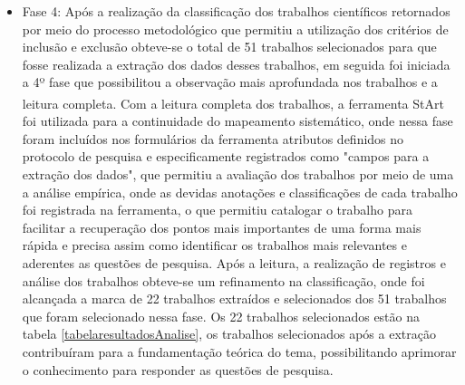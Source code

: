 \begin{itemize}
\item Fase 4: Após a realização da classificação dos trabalhos científicos retornados por meio do processo metodológico que permitiu a utilização dos critérios de inclusão e exclusão obteve-se o total de 51 trabalhos selecionados para que fosse realizada a extração dos dados desses trabalhos, em seguida foi iniciada a 4º fase que possibilitou a observação mais aprofundada nos trabalhos e a leitura completa. Com a leitura completa dos trabalhos, a ferramenta \acrshort{StArt}\textsuperscript{\textregistered} foi utilizada para a continuidade do mapeamento sistemático, onde nessa fase foram incluídos nos formulários da ferramenta atributos definidos no protocolo de pesquisa e especificamente registrados como "campos para a extração dos dados", que permitiu a avaliação dos trabalhos por meio de uma a análise empírica, onde as devidas anotações e classificações de cada trabalho foi registrada na ferramenta, o que permitiu catalogar o trabalho para facilitar a recuperação dos pontos mais importantes de uma forma mais rápida e precisa assim como identificar os trabalhos mais relevantes e aderentes as questões de pesquisa. Após a leitura, a realização de registros e análise dos trabalhos obteve-se um refinamento na classificação, onde foi alcançada a marca de 22 trabalhos extraídos e selecionados dos 51 trabalhos que foram selecionado nessa fase. Os 22 trabalhos selecionados estão na tabela \ref{tabelaresultadosAnalise}, os trabalhos selecionados após a extração contribuíram para a fundamentação teórica do tema, possibilitando aprimorar o conhecimento para responder as questões de pesquisa. 

\end{itemize}



